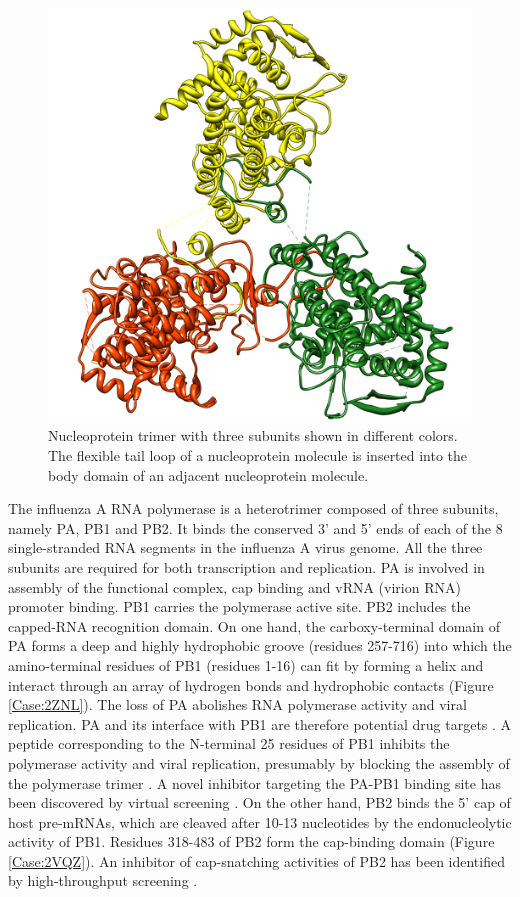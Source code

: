 \begin{figure}
\centering
\includegraphics[width=\linewidth]{../influenza/2IQH.png}
\caption{Nucleoprotein trimer with three subunits shown in different colors. The flexible tail loop of a nucleoprotein molecule is inserted into the body domain of an adjacent nucleoprotein molecule.}
\label{Case:2IQH}
\end{figure}

The influenza A RNA polymerase is a heterotrimer composed of three subunits, namely PA, PB1 and PB2. It binds the conserved 3' and 5' ends of each of the 8 single-stranded RNA segments in the influenza A virus genome. All the three subunits are required for both transcription and replication. PA is involved in assembly of the functional complex, cap binding and vRNA (virion RNA) promoter binding. PB1 carries the polymerase active site. PB2 includes the capped-RNA recognition domain. On one hand, the carboxy-terminal domain of PA forms a deep and highly hydrophobic groove (residues 257-716) into which the amino-terminal residues of PB1 (residues 1-16) can fit by forming a helix and interact through an array of hydrogen bonds and hydrophobic contacts \citep{1141} (Figure \ref{Case:2ZNL}). The loss of PA abolishes RNA polymerase activity and viral replication. PA and its interface with PB1 are therefore potential drug targets \citep{1141}. A peptide corresponding to the N-terminal 25 residues of PB1 inhibits the polymerase activity and viral replication, presumably by blocking the assembly of the polymerase trimer \citep{1234}. A novel inhibitor targeting the PA-PB1 binding site has been discovered by virtual screening \citep{1235}. On the other hand, PB2 binds the 5' cap of host pre-mRNAs, which are cleaved after 10-13 nucleotides by the endonucleolytic activity of PB1. Residues 318-483 of PB2 form the cap-binding domain (Figure \ref{Case:2VQZ}). An inhibitor of cap-snatching activities of PB2 has been identified by high-throughput screening \citep{1236}.

